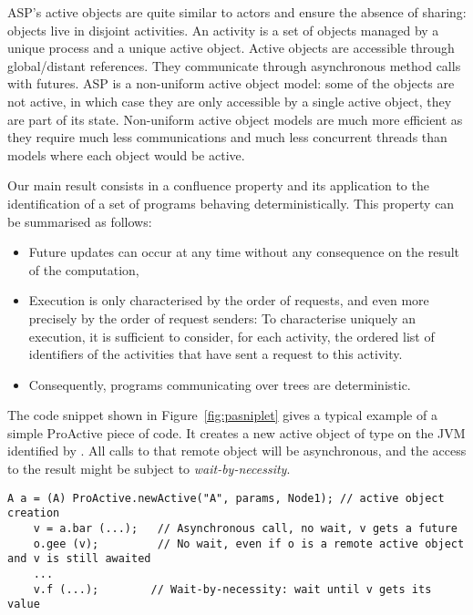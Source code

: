 ASP's active objects are quite similar to actors and ensure the
absence of sharing: objects live in disjoint activities. An activity
is a set of objects managed by a unique process and a unique
active object.  Active objects are accessible through global/distant
references.  They communicate through asynchronous method calls with
futures. 
ASP is a non-uniform active object model: some of the objects are
not active, in which case they are only accessible by a single active
object, they are part of its state. Non-uniform active object models
are much more efficient as they require much less communications and
much less concurrent threads than models where each object would be
active.

Our main result consists in a confluence property and its
application to the identification of a set of programs behaving
deterministically.  This property can be summarised as follows:
\begin{itemize}
	\item 
	Future updates can occur at any time without any consequence on the
	result of the computation,
	\item Execution is only characterised by the order of requests, and
	even more precisely by the order of request senders: To characterise
	uniquely an execution,
	it is sufficient to consider, for each activity, the ordered list
	of identifiers of the activities that have sent a request to this activity.
	\item Consequently, programs communicating over trees are deterministic.
\end{itemize}


The code snippet shown in Figure~\ref{fig:pasniplet} gives a typical
example of a simple ProActive piece of code. It
creates a new active object of type  on the JVM identified
by . All calls to that remote object will be
asynchronous, and the access to the result might be subject to \emph{wait-by-necessity}.
\begin{figure*}[t]
	\begin{lstlisting}[frame=single]
	A a = (A) ProActive.newActive("A", params, Node1); // active object creation
	v = a.bar (...);   // Asynchronous call, no wait, v gets a future
	o.gee (v);         // No wait, even if o is a remote active object and v is still awaited
	...
	v.f (...);        // Wait-by-necessity: wait until v gets its value
	\end{lstlisting}  %
	\caption{Typical ProActive code}
	\label{fig:pasniplet}
\end{figure*}%

